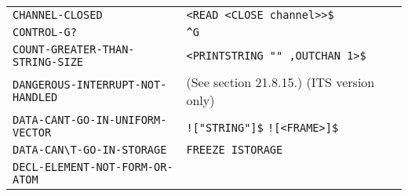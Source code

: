 \documentclass[a4paper,]{article}
\begin{document}
\begin{longtable}[]{@{}ll@{}}
\begin{minipage}[t]{0.58\columnwidth}
\texttt{CHANNEL-CLOSED}\strut
\end{minipage} & \begin{minipage}[t]{0.36\columnwidth}\raggedright\strut
\texttt{\textless{}READ\ \textless{}CLOSE\ channel\textgreater{}\textgreater{}\$}\strut
\end{minipage}\tabularnewline
\begin{minipage}[t]{0.58\columnwidth}\raggedright\strut
\texttt{CONTROL-G?}\strut
\end{minipage} & \begin{minipage}[t]{0.36\columnwidth}\raggedright\strut
\texttt{\^{}G}\strut
\end{minipage}\tabularnewline
\begin{minipage}[t]{0.58\columnwidth}\raggedright\strut
\texttt{COUNT-GREATER-THAN-STRING-SIZE}\strut
\end{minipage} & \begin{minipage}[t]{0.36\columnwidth}\raggedright\strut
\texttt{\textless{}PRINTSTRING\ ""\ ,OUTCHAN\ 1\textgreater{}\$}\strut
\end{minipage}\tabularnewline
\begin{minipage}[t]{0.58\columnwidth}\raggedright\strut
\texttt{DANGEROUS-INTERRUPT-NOT-HANDLED}\strut
\end{minipage} & \begin{minipage}[t]{0.36\columnwidth}\raggedright\strut
(See section 21.8.15.) (ITS version only)\strut
\end{minipage}\tabularnewline
\begin{minipage}[t]{0.58\columnwidth}\raggedright\strut
\texttt{DATA-CANT-GO-IN-UNIFORM-VECTOR}\strut
\end{minipage} & \begin{minipage}[t]{0.36\columnwidth}\raggedright\strut
\texttt{!{[}"STRING"{]}\$} \texttt{!{[}\textless{}FRAME\textgreater{}{]}\$}\strut
\end{minipage}\tabularnewline
\begin{minipage}[t]{0.58\columnwidth}\raggedright\strut
\texttt{DATA-CAN\textbackslash{}\textquotesingle{}T-GO-IN-STORAGE}\strut
\end{minipage} & \begin{minipage}[t]{0.36\columnwidth}\raggedright\strut
\texttt{FREEZE\ ISTORAGE}\strut
\end{minipage}\tabularnewline
\begin{minipage}[t]{0.58\columnwidth}\raggedright\strut
\texttt{DECL-ELEMENT-NOT-FORM-OR-ATOM}\strut
\end{minipage} & \begin{minipage}[t]{0.36\columnwidth}\raggedright\strut

\end{minipage}
\end{longtable}
\end{document}
